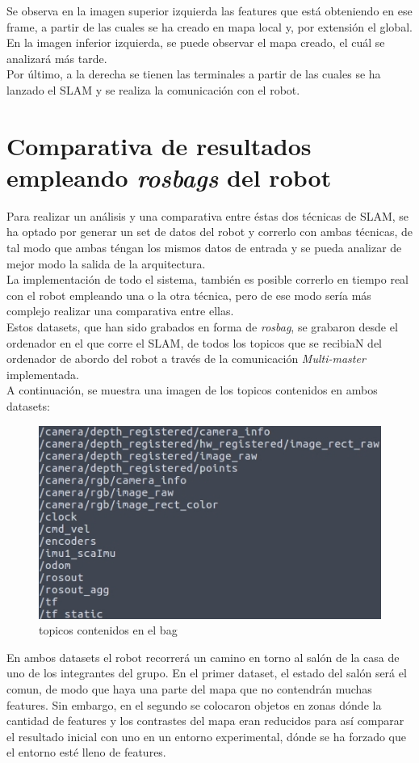 Se observa en la imagen superior izquierda las features que está obteniendo en ese frame, a partir de las cuales se ha creado en mapa local y,
por extensión el global. En la imagen inferior izquierda, se puede observar el mapa creado, el cuál se analizará más tarde.\\
Por último, a la derecha se tienen las terminales a partir de las cuales se ha lanzado el SLAM y se realiza la comunicación con el robot.\\

\newpage

\section{Comparativa de resultados empleando \textit{rosbags} del robot}
Para realizar un análisis y una comparativa entre éstas dos técnicas de SLAM, se ha optado por generar un set de datos del robot y correrlo con ambas técnicas,
de tal modo que ambas téngan los mismos datos de entrada y se pueda analizar de mejor modo la salida de la arquitectura. \\
La implementación de todo el sistema, también es posible correrlo en tiempo real con el robot empleando una o la otra técnica, pero de ese modo sería más complejo
realizar una comparativa entre ellas. \\
Estos datasets, que han sido grabados en forma de \textit{rosbag}, se grabaron desde el ordenador en el que corre el SLAM, de todos los topicos que se recibiaN
del ordenador de abordo del robot a través de la comunicación \textit{Multi-master} implementada.\\
A continuación, se muestra una imagen de los topicos contenidos en ambos datasets:
\begin{figure}[h!]
    \centering
    \includegraphics[width=.5\textwidth]{images/topics_bags}
    \caption{topicos contenidos en el bag}
\end{figure}

En ambos datasets el robot recorrerá un camino en torno al salón de la casa de uno de los integrantes del grupo. En el primer dataset, el estado del salón será 
el comun, de modo que haya una parte del mapa que no contendrán muchas features. Sin embargo, en el segundo se colocaron objetos en zonas dónde la cantidad de features
y los contrastes del mapa eran reducidos para así comparar el resultado inicial con uno en un entorno experimental, dónde se ha forzado que el entorno esté lleno de features.\\

